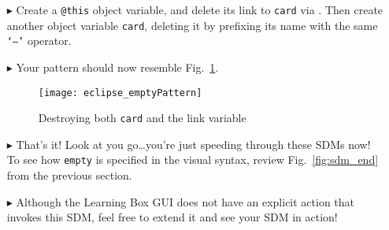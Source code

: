 \begin{itemize}
\item[$\blacktriangleright$] Create a \texttt{@this} object variable, and delete its link to \texttt{card} via . Then create another
object variable \texttt{card}, deleting it by prefixing its name with the same \texttt{`--'} operator.

\vspace{0.5cm}

\item[$\blacktriangleright$] Your pattern should now resemble Fig.~\ref{fig:emptyPattern}.

\vspace{0.5cm}

\begin{figure}[htpb]
\begin{center}
  \texttt{[image: eclipse\_emptyPattern]}
  \caption{Destroying both \texttt{card} and the link variable}
  \label{fig:emptyPattern}
\end{center}
\end{figure}

\vspace{0.5cm}

\item[$\blacktriangleright$] That's it! Look at you go\ldots you're just speeding through these SDMs now! To see how \texttt{empty} is specified in the visual
syntax, review Fig.~\ref{fig:sdm_end} from the previous section.

\vspace{0.5cm}

\item[$\blacktriangleright$] Although the Learning Box GUI does not have an explicit action that invokes this SDM, feel free to extend it and see your SDM in
action!

\end{itemize}
